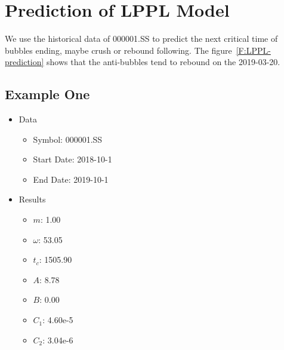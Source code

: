 \section{Prediction of LPPL  Model}
We use the historical data of 000001.SS to predict the next critical time of bubbles ending, maybe crush or rebound following. The figure~\ref{F:LPPL-prediction} shows that the anti-bubbles tend to rebound on the 2019-03-20.
\subsection{Example One}
\begin{minipage}[b]{0.5\textwidth}
\begin{itemize}
    \item Data
        \begin{itemize}
            \item Symbol: 000001.SS
            \item Start Date: 2018-10-1
            \item End Date: 2019-10-1
        \end{itemize}
\end{itemize}
\end{minipage}
\begin{minipage}{0.5\textwidth}
\begin{itemize}
    \item Results
        \begin{itemize}
            \item $m$: 1.00
            \item $\omega$: 53.05
            \item $t_c$: 1505.90
            \item $A$: 8.78
            \item $B$: 0.00
            \item $C_1$: 4.60e-5
            \item $C_2$: 3.04e-6
        \end{itemize}
\end{itemize}
\end{minipage}

